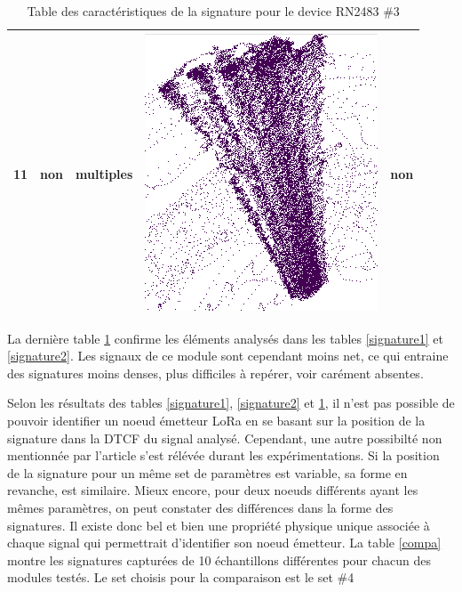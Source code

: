 \begin{table}[h]
\begin{tabular}{|c|c|c|c|c|}
\hline
11 & non & multiples & \includegraphics[scale=0.2]{images/set33.png}  & non \\
\hline
\end{tabular}
\caption{Table des caractéristiques de la signature pour le device RN2483 \#3}
\label{signature3}
\end{table}

La dernière table \ref{signature3} confirme les éléments analysés dans les tables \ref{signature1} et \ref{signature2}. Les signaux de ce module sont cependant moins net, ce qui entraine des signatures moins denses, plus difficiles à repérer, voir carément absentes.

\vspace{0.1cm}

Selon les résultats des tables \ref{signature1}, \ref{signature2} et \ref{signature3}, il n'est pas possible de pouvoir identifier un noeud émetteur LoRa en se basant sur la position de la signature dans la DTCF du signal analysé. Cependant, une autre possibilté non mentionnée par l'article s'est rélévée durant les expérimentations. Si la position de la signature pour un même set de paramètres est variable, sa forme en revanche, est similaire. Mieux encore, pour deux noeuds différents ayant les mêmes paramètres, on peut constater des différences dans la forme des signatures. Il existe donc bel et bien une propriété physique unique associée à chaque signal qui permettrait d'identifier son noeud émetteur. La table \ref{compa} montre les signatures capturées de 10 échantillons différentes pour chacun des modules testés. Le set choisis pour la comparaison est le set \#4

